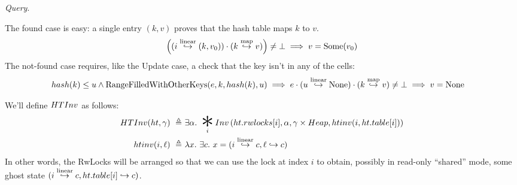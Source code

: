\documentclass{article}
\newcommand{\BigAsterisk}{\mathop{\scalebox{3}{\raisebox{-0.2ex}{$\ast$}}}}%
\DeclareMathOperator{\RangeFilledWithOtherKeys}{RangeFilledWithOtherKeys}
\renewcommand{\eqdef}{\triangleq}
\newcommand{\pointsto}{\hookrightarrow}
\begin{document}
\emph{Query}.

The found case is easy: a single entry $(k,v)$ proves that the hash table maps $k$ to $v$.
\[
  \left((i \stackrel{\text{linear}}{\hookrightarrow} (k,v_0)) \cdot (k \stackrel{\text{map}}{\hookrightarrow} v)\right) \ne \bot \implies v = \text{Some}(v_0)
\]
The not-found case requires, like the Update case, a check that the key isn't in any of the cells:
\begin{align*}
&\hash(k) \le u \land \RangeFilledWithOtherKeys(e, k, \hash(k), u)
  \implies e \cdot (u \entryto \None) \cdot (k \hashto v) \ne \bot \implies v = \None
\end{align*}

We'll define $HTInv$ as follows:
\begin{align*}
\HTInv(ht, \gamma) ~\eqdef~& \exists\alpha.~ \BigAsterisk_i \Inv\left(ht.rwlocks[i], \alpha, \gamma\times\Heap, \htinv(i, ht.table[i])\right)\\
\htinv(i, \ell) ~\eqdef~& \lambda x .~ \exists c .~ x = (i \entryto c, \ell \pointsto c)
\end{align*}
In other words, the RwLocks will be arranged so that we can use the lock at index $i$ to obtain, possibly in read-only ``shared'' mode,
some ghost state $(i \entryto c, ht.table[i] \pointsto c)$.

\newpage
\end{document}
